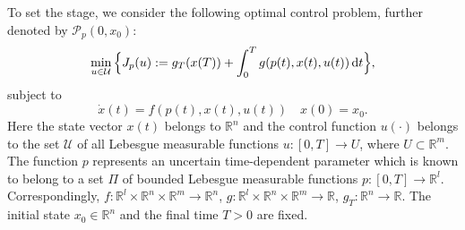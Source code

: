 \documentclass[11pt]{article}
\newcommand{\be}{\begin{equation}}
\newcommand{\ee}{\end{equation}}
\newcommand{\R}{\mathbb R}
\newcommand{\st}{\subset}
\newcommand{\U}{\mathcal U}
\newcommand{\dd}{\mbox{\rm\,d}}
\newcommand{\p}{{\mathcal P}}
\def\R{\mathbb{R}}
\begin{document}
To set the stage, we consider the following optimal control problem, further denoted by $\p_p(0,x_0)$:
\be \label{EOF}
  \min_{u\in \U} \Big\{ J_p(u) := g_T(x(T)) + \int_0^T  g(p(t),x(t),u(t)) \dd t \Big\},
\ee
subject to
\be \label{Ex}
      \dot x(t) = f(p(t), x(t), u(t))  \quad  x(0)=x_0.
\ee
Here the state vector $x(t)$ belongs to $\R^n$ and the control function $u(\cdot)$ belongs to the set $\U$ 
of all Lebesgue measurable functions $u:[0,T] \to U$, where $U\st \R^m$. The function $p$ represents 
an uncertain time-dependent parameter which is known to belong to 
a set $\varPi$ of bounded Lebesgue measurable functions $p:[0,T] \to \R^l$.
Correspondingly, $f:\R^l\times\R^n\times\R^m\to\R^n$, $g:\R^l\times\R^n\times\R^m\to\R$, $g_T:\mathbb R^n\to\mathbb R$. 
The initial state $x_0 \in \R^n$ and the final time $T>0$ are fixed.
\end{document}
